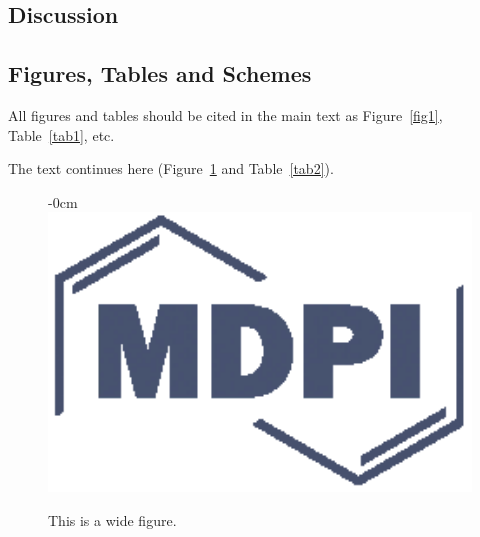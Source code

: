 \documentclass[remotesensing,article,submit,pdftex,moreauthors]{Definitions/mdpi}
\begin{document}
\subsection{Discussion}

 

\subsection{Figures, Tables and Schemes}

All figures and tables should be cited in the main text as Figure~\ref{fig1}, Table~\ref{tab1}, etc.





The text continues here (Figure~\ref{fig2} and Table~\ref{tab2}).

\begin{figure}[H]
\begin{adjustwidth}{-\extralength}{0cm}
\centering
\includegraphics[width=15.5cm]{Definitions/logo-mdpi}
\end{adjustwidth}
\caption{This is a wide figure.\label{fig2}}
\end{figure}  
\end{document}
